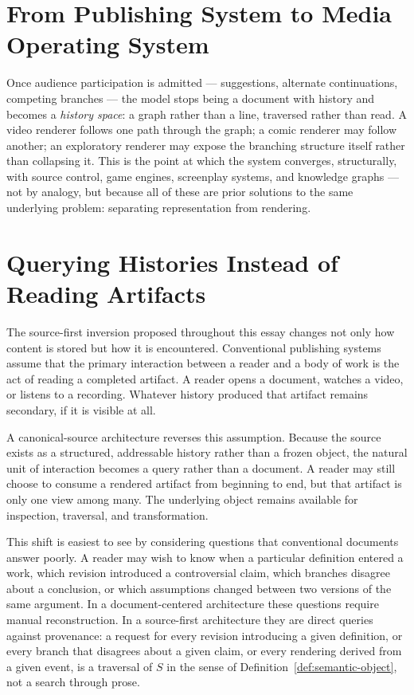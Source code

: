\documentclass[11pt]{article}
\theoremstyle{definition}
\begin{document}
\section{From Publishing System to Media Operating System}
\label{sec:media-os}

Once audience participation is admitted --- suggestions, alternate continuations, competing branches --- the model stops being a document with history and becomes a \emph{history space}: a graph rather than a line, traversed rather than read. A video renderer follows one path through the graph; a comic renderer may follow another; an exploratory renderer may expose the branching structure itself rather than collapsing it. This is the point at which the system converges, structurally, with source control, game engines, screenplay systems, and knowledge graphs --- not by analogy, but because all of these are prior solutions to the same underlying problem: separating representation from rendering.

\section{Querying Histories Instead of Reading Artifacts}
\label{sec:querying}

The source-first inversion proposed throughout this essay changes not only how content is stored but how it is encountered. Conventional publishing systems assume that the primary interaction between a reader and a body of work is the act of reading a completed artifact. A reader opens a document, watches a video, or listens to a recording. Whatever history produced that artifact remains secondary, if it is visible at all.

A canonical-source architecture reverses this assumption. Because the source exists as a structured, addressable history rather than a frozen object, the natural unit of interaction becomes a query rather than a document. A reader may still choose to consume a rendered artifact from beginning to end, but that artifact is only one view among many. The underlying object remains available for inspection, traversal, and transformation.

This shift is easiest to see by considering questions that conventional documents answer poorly. A reader may wish to know when a particular definition entered a work, which revision introduced a controversial claim, which branches disagree about a conclusion, or which assumptions changed between two versions of the same argument. In a document-centered architecture these questions require manual reconstruction. In a source-first architecture they are direct queries against provenance: a request for every revision introducing a given definition, or every branch that disagrees about a given claim, or every rendering derived from a given event, is a traversal of $S$ in the sense of Definition~\ref{def:semantic-object}, not a search through prose.
\end{document}
